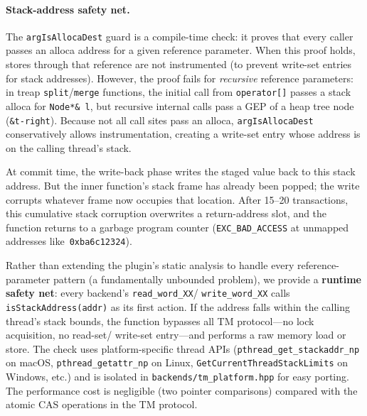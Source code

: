 \documentclass[article,12pt]{article}
\begin{document}
\paragraph{Stack-address safety net.}
The \texttt{argIsAllocaDest} guard is a compile-time check: it proves that
every caller passes an alloca address for a given reference parameter.
When this proof holds, stores through that reference are not instrumented
(to prevent write-set entries for stack addresses).  However, the proof
fails for \emph{recursive} reference parameters: in treap
\texttt{split}/\texttt{merge} functions, the initial call from
\texttt{operator[]} passes a stack alloca for \texttt{Node*\& l}, but
recursive internal calls pass a GEP of a heap tree node
(\texttt{\&t-\/right}).  Because not all call sites pass an alloca,
\texttt{argIsAllocaDest} conservatively allows instrumentation, creating a
write-set entry whose address is on the calling thread's stack.

At commit time, the write-back phase writes the staged value back to this
stack address.  But the inner function's stack frame has already been
popped; the write corrupts whatever frame now occupies that location.
After 15--20 transactions, this cumulative stack corruption overwrites a
return-address slot, and the function returns to a garbage program counter
(\texttt{EXC\_BAD\_ACCESS} at unmapped addresses like~\texttt{0xba6c12324}).

Rather than extending the plugin's static analysis to handle every
reference-parameter pattern (a fundamentally unbounded problem), we provide
a \textbf{runtime safety net}: every backend's \texttt{read\_word\_XX}/
\texttt{write\_word\_XX} calls \texttt{isStackAddress(addr)} as its first
action.  If the address falls within the calling thread's stack bounds, the
function bypasses all TM protocol---no lock acquisition, no read-set/
write-set entry---and performs a raw memory load or store.  The check uses
platform-specific thread APIs (\texttt{pthread\_get\_stackaddr\_np} on
macOS, \texttt{pthread\_getattr\_np} on Linux,
\texttt{GetCurrentThreadStackLimits} on Windows, etc.) and is isolated in
\texttt{backends/tm\_platform.hpp} for easy porting.  The performance cost
is negligible (two pointer comparisons) compared with the atomic CAS
operations in the TM protocol.
\end{document}
